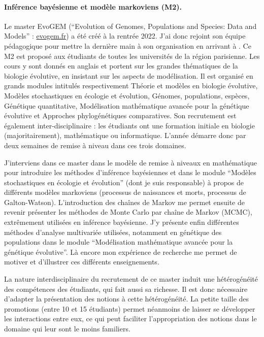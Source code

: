 \paragraph{Inférence bayésienne et modèle markoviens (M2).}
Le master EvoGEM (“Evolution of Genomes, Populations and Species: Data and Models” : \url{evogem.fr}) a été créé à la rentrée 2022. J’ai donc rejoint son équipe pédagogique pour mettre la dernière main à son organisation en arrivant à \SU. Ce M2 est proposé aux étudiants de toutes les universités de la région parisienne. Les cours y sont donnés en anglais et portent sur les grandes thématiques de la biologie évolutive, en insistant sur les aspects de modélisation. Il est organisé en grands modules intitulés respectivement Théorie et modèles en biologie évolutive, Modèles stochastiques en écologie et évolution, Génomes, populations, espèces, Génétique quantitative, Modélisation mathématique avancée pour la génétique évolutive et Approches phylogénétiques comparatives. Son recrutement est également inter-disciplinaire : les étudiants ont une formation initiale en biologie (majoritairement), mathématique ou informatique. L’année démarre donc par deux semaines de remise à niveau dans ces trois domaines.

J’interviens dans ce master dans le modèle de remise à niveaux en mathématique pour introduire les méthodes d’inférence bayésiennes et dans le module “Modèles stochastiques en écologie et évolution” (dont je suis responsable) à propos de différents modèles markoviens (processus de naissances et morts, processus de Galton-Watson). L’introduction des chaînes de Markov me permet ensuite de revenir présenter les méthodes de Monte Carlo par chaîne de Markov (MCMC), extrêmement utilisées en inférence bayésienne. J'y présente enfin différentes méthodes d'analyse multivariée utilisées, notamment en génétique des populations dans le module “Modélisation mathématique avancée pour la génétique évolutive”. Là encore mon expérience de recherche me permet de motiver et d’illustrer ces différents enseignements.

La nature interdisciplinaire du recrutement de ce master induit une hétérogénéité des compétences des étudiants, qui fait aussi sa richesse. Il est donc nécessaire d’adapter la présentation des notions à cette hétérogénéité. La petite taille des promotions (entre 10 et 15 étudiants) permet néanmoins de laisser se développer les interactions entre eux, ce qui peut faciliter l’appropriation des notions dans le domaine qui leur sont le moins familiers.

